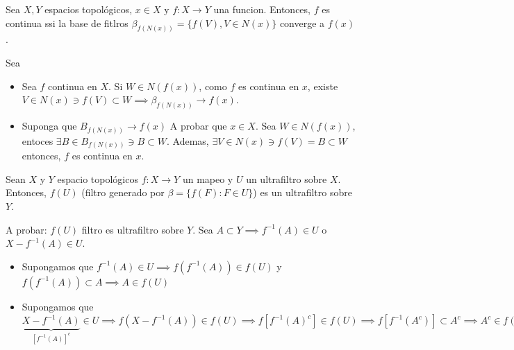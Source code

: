 \begin{teorema}
    Sea $X,Y$ espacios topológicos, $x\in X$ y $f: X\to Y$ una funcion. Entonces, $f$ es continua ssi la base de fitlros $\beta_{f(N(x))}=\{f(V), V\in N(x)\}$ converge a $f(x)$. 
    \begin{dem}
        Sea \begin{itemize}
            \item Sea $f$ continua en $X$. Si $W\in N(f(x))$, como $f$ es continua en $x$, existe $V\in N(x)\ni f(V)\subset W\implies \beta_{f(N(x))}\to f(x)$. 
            \item Suponga que $B_{f(N(x))}\to f(x)$ A probar que $x\in X$. Sea $W\in N(f(x))$, entoces $\exists B\in B_{f(N(x))}\ni B\subset W$. Ademas, $\exists V\in N(x)\ni f(V)=B\subset W$ entonces, $f$ es continua en $x$.
        \end{itemize}
        
    \end{dem}
\end{teorema}


\begin{lema}
    Sean $X$ y $Y$ espacio topológicos $f:X\to Y$ un mapeo y $U$ un ultrafiltro sobre $X$. Entonces, $f(U)$ (filtro generado por $\beta=\{f(F):F\in U\}$) es un ultrafiltro sobre $Y$. 
    \begin{dem}
        A probar: $f(U)$ filtro es ultrafiltro sobre $Y$. Sea $A\subset Y\implies f^{-1}(A)\in U$ o $X-f^{-1}(A)\in U$. 
        \begin{itemize}
            \item Supongamos que $f^{-1}(A)\in U\implies f(f^{-1}(A))\in f(U)$ y $f(f^{-1}(A))\subset A\implies A \in f(U)$
            \item Supongamos que $\underbrace{X-f^{-1}(A)}_{[f^{-1}(A)]^c}\in U\implies f(X-f^{-1}(A))\in f(U)\implies f[f^{-1}(A)^c]\in f(U)\implies f[f^{-1}(A^c)]\subset A^c \implies A^c\in f(U)$
        \end{itemize}
    \end{dem}
\end{lema}



